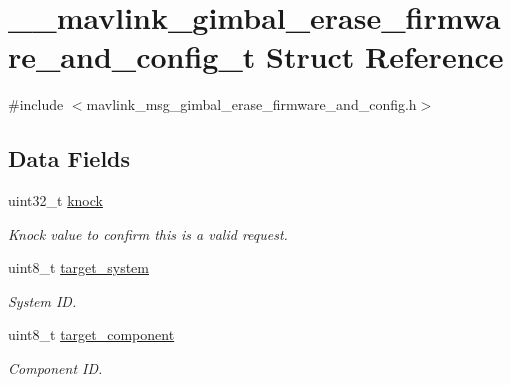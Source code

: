 \hypertarget{struct____mavlink__gimbal__erase__firmware__and__config__t}{\section{\+\_\+\+\_\+mavlink\+\_\+gimbal\+\_\+erase\+\_\+firmware\+\_\+and\+\_\+config\+\_\+t Struct Reference}
\label{struct____mavlink__gimbal__erase__firmware__and__config__t}
}


{\ttfamily \#include $<$mavlink\+\_\+msg\+\_\+gimbal\+\_\+erase\+\_\+firmware\+\_\+and\+\_\+config.\+h$>$}

\subsection*{Data Fields}
\begin{DoxyCompactItemize}
\item 
uint32\+\_\+t \hyperlink{struct____mavlink__gimbal__erase__firmware__and__config__t_afd38bf2bf1e91aae1d92b12be45ce0b5}{knock}
\begin{DoxyCompactList}\small\item\em Knock value to confirm this is a valid request. \end{DoxyCompactList}\item 
uint8\+\_\+t \hyperlink{struct____mavlink__gimbal__erase__firmware__and__config__t_a57f32582e95e3bfff3c32a4fe4b54887}{target\+\_\+system}
\begin{DoxyCompactList}\small\item\em System I\+D. \end{DoxyCompactList}\item 
uint8\+\_\+t \hyperlink{struct____mavlink__gimbal__erase__firmware__and__config__t_aacb2b029a82694e108b0a1344520ca25}{target\+\_\+component}
\begin{DoxyCompactList}\small\item\em Component I\+D. \end{DoxyCompactList}\end{DoxyCompactItemize}


